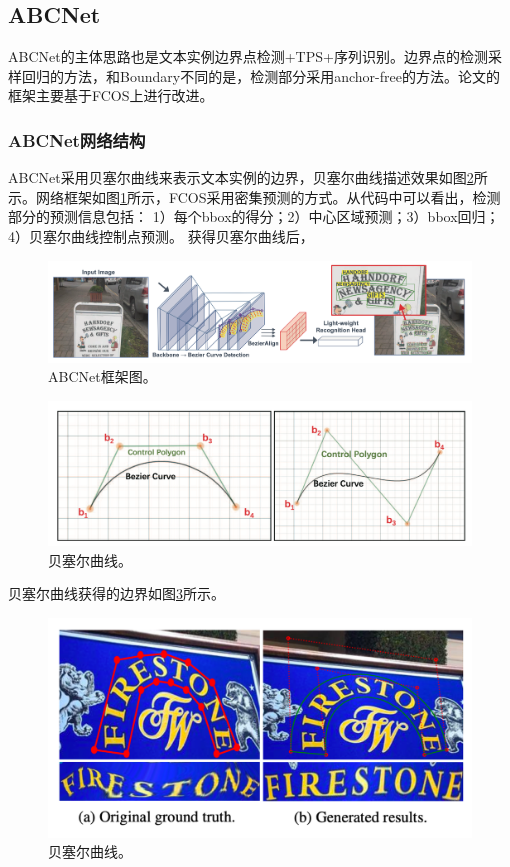 \subsection{ABCNet}
ABCNet的主体思路也是文本实例边界点检测+TPS+序列识别。边界点的检测采样回归的方法，和Boundary不同的是，检测部分采用anchor-free的方法。论文的框架主要基于FCOS\cite{tian2019fcos}上进行改进。
\subsubsection{ABCNet网络结构}
ABCNet采用贝塞尔曲线来表示文本实例的边界，贝塞尔曲线描述效果如图\ref{abcnet_basier}所示。网络框架如图\ref{abcnet_framework}所示，FCOS采用密集预测的方式。从代码中可以看出，检测部分的预测信息包括：
1）每个bbox的得分；2）中心区域预测；3）bbox回归；4）贝塞尔曲线控制点预测。
获得贝塞尔曲线后，
\begin{figure}[htb]
    \centering
    \includegraphics[width=.98\textwidth]{figure/spotting/abcnet_framework.png} 
    \caption{ABCNet框架图。} 
    \label{abcnet_framework} 
\end{figure}

\begin{figure}[htb]
    \centering
    \includegraphics[width=.98\textwidth]{figure/spotting/abcnet_basier.png} 
    \caption{贝塞尔曲线。} 
    \label{abcnet_basier} 
\end{figure}

贝塞尔曲线获得的边界如图\ref{abcnet_sample}所示。
\begin{figure}[htb]
    \centering
    \includegraphics[width=.98\textwidth]{figure/spotting/abcnet_sample.png} 
    \caption{贝塞尔曲线。} 
    \label{abcnet_sample} 
\end{figure}

